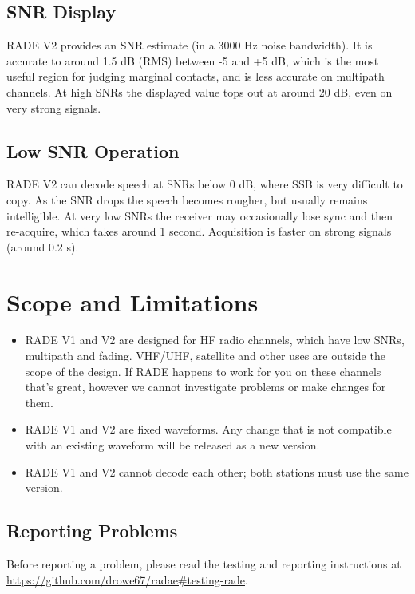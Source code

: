 \documentclass{article}
\begin{document}
\subsection{SNR Display}

RADE V2 provides an SNR estimate (in a 3000 \si{Hz} noise bandwidth).  It is accurate to around 1.5 \si{dB} (RMS) between -5 and +5 \si{dB}, which is the most useful region for judging marginal contacts, and is less accurate on multipath channels.  At high SNRs the displayed value tops out at around 20 \si{dB}, even on very strong signals.

\subsection{Low SNR Operation}

RADE V2 can decode speech at SNRs below 0 \si{dB}, where SSB is very difficult to copy.  As the SNR drops the speech becomes rougher, but usually remains intelligible.  At very low SNRs the receiver may occasionally lose sync and then re-acquire, which takes around 1 second.  Acquisition is faster on strong signals (around 0.2 \si{s}).

\section{Scope and Limitations}

\begin{itemize}
\item RADE V1 and V2 are designed for HF radio channels, which have low SNRs, multipath and fading.  VHF/UHF, satellite and other uses are outside the scope of the design.  If RADE happens to work for you on these channels that's great, however we cannot investigate problems or make changes for them.
\item RADE V1 and V2 are fixed waveforms.  Any change that is not compatible with an existing waveform will be released as a new version.
\item RADE V1 and V2 cannot decode each other; both stations must use the same version.
\end{itemize}

\subsection{Reporting Problems}

Before reporting a problem, please read the testing and reporting instructions at \url{https://github.com/drowe67/radae\#testing-rade}.
\end{document}
